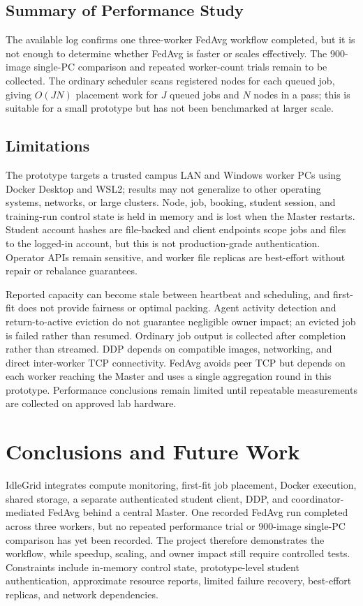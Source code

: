 \documentclass{article}
\begin{document}
	\subsection{Summary of Performance Study}

The available log confirms one three-worker FedAvg workflow completed, but it is not enough to determine whether FedAvg is faster or scales effectively. The 900-image single-PC comparison and repeated worker-count trials remain to be collected. The ordinary scheduler scans registered nodes for each queued job, giving \(O(JN)\) placement work for \(J\) queued jobs and \(N\) nodes in a pass; this is suitable for a small prototype but has not been benchmarked at larger scale.
    
    \subsection{Limitations}
The prototype targets a trusted campus LAN and Windows worker PCs using Docker Desktop and WSL2; results may not generalize to other operating systems, networks, or large clusters. Node, job, booking, student session, and training-run control state is held in memory and is lost when the Master restarts. Student account hashes are file-backed and client endpoints scope jobs and files to the logged-in account, but this is not production-grade authentication. Operator APIs remain sensitive, and worker file replicas are best-effort without repair or rebalance guarantees.

Reported capacity can become stale between heartbeat and scheduling, and first-fit does not provide fairness or optimal packing. Agent activity detection and return-to-active eviction do not guarantee negligible owner impact; an evicted job is failed rather than resumed. Ordinary job output is collected after completion rather than streamed. DDP depends on compatible images, networking, and direct inter-worker TCP connectivity. FedAvg avoids peer TCP but depends on each worker reaching the Master and uses a single aggregation round in this prototype. Performance conclusions remain limited until repeatable measurements are collected on approved lab hardware.

\pagebreak
\section{Conclusions and Future Work}

IdleGrid integrates compute monitoring, first-fit job placement, Docker execution, shared storage, a separate authenticated student client, DDP, and coordinator-mediated FedAvg behind a central Master. One recorded FedAvg run completed across three workers, but no repeated performance trial or 900-image single-PC comparison has yet been recorded. The project therefore demonstrates the workflow, while speedup, scaling, and owner impact still require controlled tests. Constraints include in-memory control state, prototype-level student authentication, approximate resource reports, limited failure recovery, best-effort replicas, and network dependencies.
\end{document}
